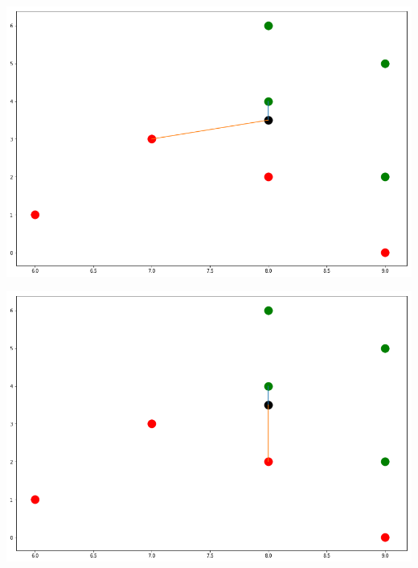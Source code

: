 \documentclass[fontsize=11pt]{scrartcl}
\newenvironment{Figure}
  {\par\medskip\noindent\minipage{\linewidth}}
  {\endminipage\par\medskip}
\begin{document}
                \begin{Figure}
                    \begin{minipage}[b]{.4\linewidth}
                        \includegraphics[scale=0.2]{knn2_b.png}
                    \end{minipage}
                    \hspace{.1\linewidth}
                    \begin{minipage}[b]{.4\linewidth}
                        \includegraphics[scale=0.2]{knn3.png}
                    \end{minipage}
                    \hspace{.1\linewidth}
                    \begin{minipage}[b]{.4\linewidth}

\end{minipage}
\end{Figure}
\end{document}
